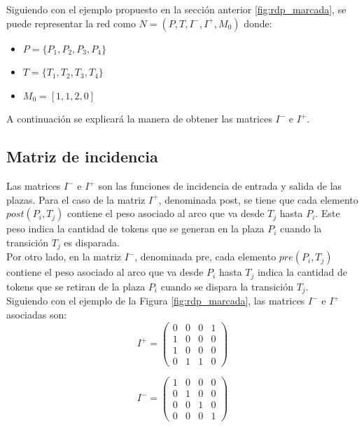 Siguiendo con el ejemplo propuesto en la sección anterior \ref{fig:rdp_marcada}, se puede representar la red como $N = (P, T, I^-, I^+, M_0)$ donde:

\begin{itemize}
    \item $P = \{P_1, P_2, P_3, P_4\}$
    \item $T = \{T_1, T_2, T_3, T_4\}$
    \item $M_0 = [1, 1, 2, 0]$
\end{itemize}

A continuación se explicará la manera de obtener las matrices $I^-$ e $I^+$.

\subsection{Matriz de incidencia}
Las matrices $I^-$ e $I^+$ son las funciones de incidencia de entrada y salida de las plazas. Para el caso de la matriz $I^+$, denominada post, se tiene que cada elemento $post(P_i, T_j)$ contiene el peso asociado al arco que va desde $T_j$ hasta $P_i$. Este peso indica la cantidad de tokens que se generan en la plaza $P_i$ cuando la transición $T_j$ es disparada.\\

Por otro lado, en la matriz $I^-$, denominada pre, cada elemento $pre(P_i, T_j)$ contiene el peso asociado al arco que va desde $P_i$ hasta $T_j$ indica la cantidad de tokens que se retiran de la plaza $P_i$ cuando se dispara la transición $T_j$.\\

Siguiendo con el ejemplo de la Figura \ref{fig:rdp_marcada}, las matrices $I^-$ e $I^+$ asociadas son:
\begin{equation}
I^+ =
    \begin{pmatrix}
        0 & 0 & 0 & 1\\
        1 & 0 & 0 & 0\\
        1 & 0 & 0 & 0\\
        0 & 1 & 1 & 0
    \end{pmatrix}
\end{equation}
    
\begin{equation}
I^- =
    \begin{pmatrix}
        1 & 0 & 0 & 0\\
        0 & 1 & 0 & 0\\
        0 & 0 & 1 & 0\\
        0 & 0 & 0 & 1
    \end{pmatrix}
\end{equation}

